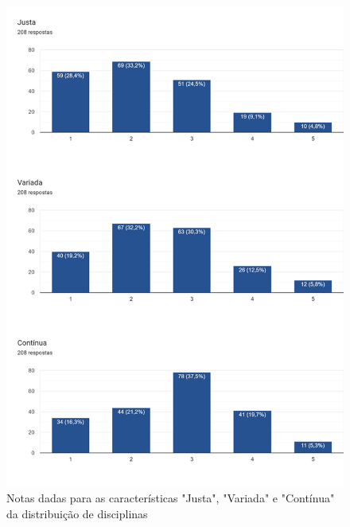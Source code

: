         
        \begin{figure}[htbp]
            \centering
            \caption{\label{fig:6.0-Opiniao-1_3}Notas dadas para as características "Justa", "Variada" e "Contínua" da distribuição de disciplinas}
            \includegraphics[scale=0.4]{files/img/Forms/6.0-Opiniao-1_3.png}
        \end{figure}
        
